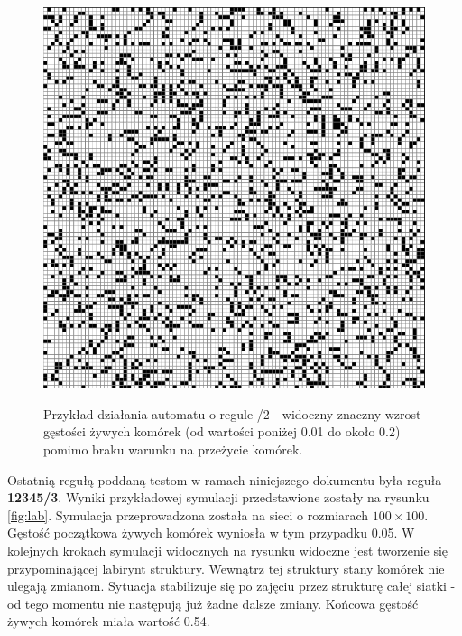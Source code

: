 \documentclass[12pt] {article}
\begin{document}
\begin{figure}[H]
\begin{minipage}[t]{.3\textwidth}
        \label{fig:seeds2}
    \end{minipage}
    \hfill
    \begin{minipage}[t]{.3\textwidth}
        \centering
        \includegraphics[width=\textwidth]{res/seeds_120.png}
        \label{fig:seeds3}
    \end{minipage}
    \caption{Przykład działania automatu o regule /2 - widoczny znaczny wzrost gęstości żywych komórek (od wartości poniżej 0.01 do około 0.2) pomimo braku warunku na przeżycie komórek.}
    \label{fig:seeds}
\end{figure}

\newpage
Ostatnią regułą poddaną testom w ramach niniejszego dokumentu była reguła \textbf{12345/3}. Wyniki przykładowej symulacji przedstawione zostały na rysunku \ref{fig:lab}. Symulacja przeprowadzona została na sieci o rozmiarach $100\times100$. Gęstość początkowa żywych komórek wyniosła w tym przypadku 0.05. W kolejnych krokach symulacji widocznych na rysunku widoczne jest tworzenie się przypominającej labirynt struktury. Wewnątrz tej struktury stany komórek nie ulegają zmianom. Sytuacja stabilizuje się po zajęciu przez strukturę całej siatki - od tego momentu nie następują już żadne dalsze zmiany. Końcowa gęstość żywych komórek miała wartość 0.54. 
\end{document}
